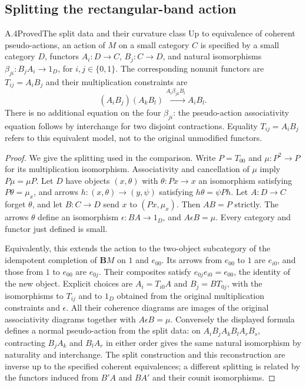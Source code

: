 \subsection{Splitting the rectangular-band action}
\begin{result}{A.4}{Proved}{The split data and their curvature class}
Up to equivalence of coherent pseudo-actions, an action of $M$ on a small category $C$ is specified by a small category $D$, functors $A_i:D\to C$, $B_j:C\to D$, and natural isomorphisms $\beta_{ji}:B_jA_i\to1_D$, for $i,j\in\{0,1\}$. The corresponding nonunit functors are $T_{ij}=A_iB_j$ and their multiplication constraints are
\[
 (A_iB_j)(A_kB_l)\xrightarrow{A_i\beta_{jk}B_l}A_iB_l.
\]
There is no additional equation on the four $\beta_{ji}$: the pseudo-action associativity equation follows by interchange for two disjoint contractions. Equality $T_{ij}=A_iB_j$ refers to this equivalent model, not to the original unmodified functors.
\end{result}
\begin{proof}
We give the splitting used in the comparison. Write $P=T_{00}$ and $\mu:P^2\to P$ for its multiplication isomorphism. Associativity and cancellation of $\mu$ imply $P\mu=\mu P$. Let $D$ have objects $(x,\theta)$ with $\theta:Px\to x$ an isomorphism satisfying $P\theta=\mu_x$, and arrows $h:(x,\theta)\to(y,\psi)$ satisfying $h\theta=\psi Ph$. Let $A:D\to C$ forget $\theta$, and let $B:C\to D$ send $x$ to $(Px,\mu_x)$. Then $AB=P$ strictly. The arrows $\theta$ define an isomorphism $\epsilon:BA\to1_D$, and $A\epsilon B=\mu$. Every category and functor just defined is small.

Equivalently, this extends the action to the two-object subcategory of the idempotent completion of $\mathbf BM$ on $1$ and $e_{00}$. Its arrows from $e_{00}$ to $1$ are $e_{i0}$, and those from $1$ to $e_{00}$ are $e_{0j}$. Their composites satisfy $e_{0j}e_{i0}=e_{00}$, the identity of the new object. Explicit choices are $A_i=T_{i0}A$ and $B_j=BT_{0j}$, with the isomorphisms to $T_{ij}$ and to $1_D$ obtained from the original multiplication constraints and $\epsilon$. All their coherence diagrams are images of the original associativity diagrams together with $A\epsilon B=\mu$. Conversely the displayed formula defines a normal pseudo-action from the split data: on $A_iB_jA_kB_lA_rB_s$, contracting $B_jA_k$ and $B_lA_r$ in either order gives the same natural isomorphism by naturality and interchange. The split construction and this reconstruction are inverse up to the specified coherent equivalences; a different splitting is related by the functors induced from $B'A$ and $BA'$ and their counit isomorphisms.
\end{proof}

